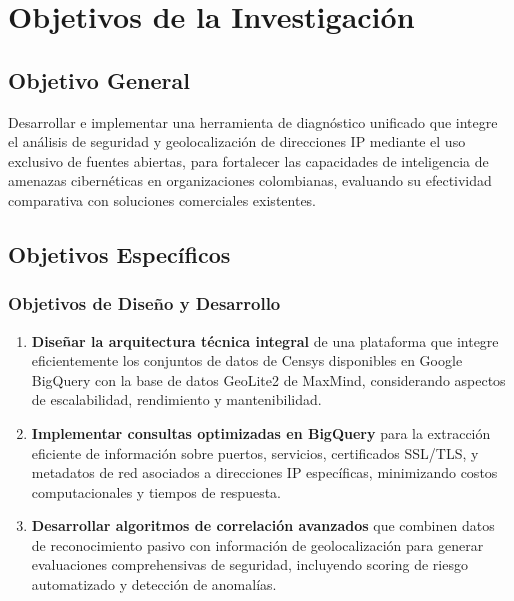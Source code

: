\section{Objetivos de la Investigación}

\subsection{Objetivo General}
Desarrollar e implementar una herramienta de diagnóstico unificado que integre el análisis de seguridad y geolocalización de direcciones IP mediante el uso exclusivo de fuentes abiertas, para fortalecer las capacidades de inteligencia de amenazas cibernéticas en organizaciones colombianas, evaluando su efectividad comparativa con soluciones comerciales existentes.

\subsection{Objetivos Específicos}

\subsubsection{Objetivos de Diseño y Desarrollo}
\begin{enumerate}
    \item \textbf{Diseñar la arquitectura técnica integral} de una plataforma que integre eficientemente los conjuntos de datos de Censys disponibles en Google BigQuery con la base de datos GeoLite2 de MaxMind, considerando aspectos de escalabilidad, rendimiento y mantenibilidad.
    
    \item \textbf{Implementar consultas optimizadas en BigQuery} para la extracción eficiente de información sobre puertos, servicios, certificados SSL/TLS, y metadatos de red asociados a direcciones IP específicas, minimizando costos computacionales y tiempos de respuesta.
    
    \item \textbf{Desarrollar algoritmos de correlación avanzados} que combinen datos de reconocimiento pasivo con información de geolocalización para generar evaluaciones comprehensivas de seguridad, incluyendo scoring de riesgo automatizado y detección de anomalías.
\end{enumerate}

